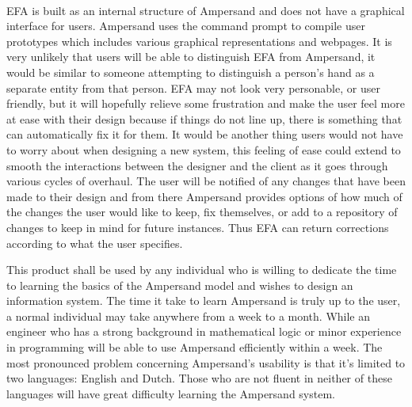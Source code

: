 \documentclass[12pt]{report}
\begin{document}
\paragraph*{}
EFA is built as an internal structure of Ampersand and does not have a graphical interface for 
users. Ampersand uses the command prompt to compile user prototypes which includes various 
graphical representations and webpages. It is very unlikely that users will be able to distinguish 
EFA from Ampersand, it would be similar to someone attempting to distinguish a person’s hand as 
a separate entity from that person. EFA may not look very personable, or user friendly, but it 
will hopefully relieve some frustration and make the user feel more at ease with their design 
because if things do not line up, there is something that can automatically fix it for them. It 
would be another thing users would not have to worry about when designing a new system, this 
feeling of ease could extend to smooth the interactions between the designer and the client as it 
goes through various cycles of overhaul. The user will be notified of any changes that have been 
made to their design and from there Ampersand provides options of how much of the changes the user 
would like to keep, fix themselves, or add to a repository of changes to keep in mind for future 
instances. Thus EFA can return corrections according to what the user specifies.

This product shall be used by any individual who is willing to dedicate the time to learning the 
basics of the Ampersand model and wishes to design an information system. The time it take to learn 
Ampersand is truly up to the user, a normal individual may take anywhere from a week to a month. 
While an engineer who has a strong background in mathematical logic or minor experience in 
programming will be able to use Ampersand efficiently within a week. The most pronounced problem 
concerning Ampersand’s usability is that it’s limited to two languages: English and Dutch. Those 
who are not fluent in neither of these languages will have great difficulty learning the Ampersand 
system.
\end{document}
